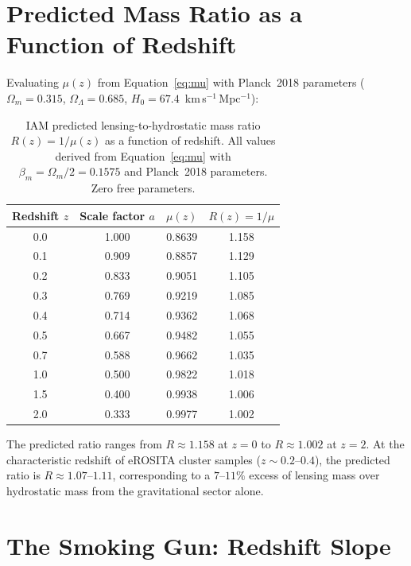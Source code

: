 \documentclass[12pt,a4paper]{article}
\begin{document}
\section{Predicted Mass Ratio as a Function of Redshift}

Evaluating $\mu(z)$ from Equation~\ref{eq:mu} with Planck~2018 parameters
($\Omega_m = 0.315$, $\Omega_\Lambda = 0.685$, $H_0 = 67.4$~km\,s$^{-1}$\,Mpc$^{-1}$):

\begin{table}[h]
\centering
\caption{IAM predicted lensing-to-hydrostatic mass ratio $R(z) = 1/\mu(z)$ as a
function of redshift. All values derived from Equation~\ref{eq:mu} with
$\beta_m = \Omega_m/2 = 0.1575$ and Planck~2018 parameters. Zero free parameters.}
\label{tab:ratio}
\begin{tabular}{cccc}
\toprule
Redshift $z$ & Scale factor $a$ & $\mu(z)$ & $R(z) = 1/\mu$ \\
\midrule
0.0 & 1.000 & 0.8639 & 1.158 \\
0.1 & 0.909 & 0.8857 & 1.129 \\
0.2 & 0.833 & 0.9051 & 1.105 \\
0.3 & 0.769 & 0.9219 & 1.085 \\
0.4 & 0.714 & 0.9362 & 1.068 \\
0.5 & 0.667 & 0.9482 & 1.055 \\
0.7 & 0.588 & 0.9662 & 1.035 \\
1.0 & 0.500 & 0.9822 & 1.018 \\
1.5 & 0.400 & 0.9938 & 1.006 \\
2.0 & 0.333 & 0.9977 & 1.002 \\
\bottomrule
\end{tabular}
\end{table}

The predicted ratio ranges from $R \approx 1.158$ at $z = 0$ to $R \approx 1.002$
at $z = 2$. At the characteristic redshift of eROSITA cluster samples
($z \sim 0.2$--$0.4$), the predicted ratio is $R \approx 1.07$--$1.11$,
corresponding to a $7$--$11\%$ excess of lensing mass over hydrostatic mass from
the gravitational sector alone.

\section{The Smoking Gun: Redshift Slope}
\end{document}
